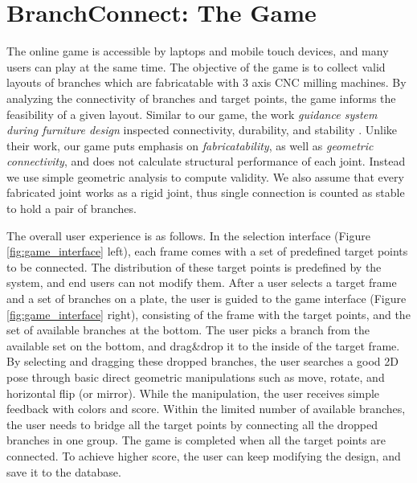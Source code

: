 \section{BranchConnect: The Game}
\label{sec:game}
The online game is accessible by laptops and mobile touch devices, and many users can play at the same time.
The objective of the game is to collect valid layouts of branches which are fabricatable with 3 axis CNC milling machines.
By analyzing the connectivity of branches and target points, the game informs the feasibility of a given layout.
Similar to our game, the work \textit{guidance system during furniture design} inspected connectivity, durability, and stability \cite{umetani2012guided}.
Unlike their work, our game puts emphasis on \textit{fabricatability}, as well as \textit{geometric connectivity}, and does not calculate structural performance of each joint.
Instead we use simple geometric analysis to compute validity.
We also assume that every fabricated joint works as a rigid joint, thus single connection is counted as stable to hold a pair of branches.

The overall user experience is as follows.
In the selection interface (Figure \ref{fig:game_interface} left), each frame comes with a set of predefined target points to be connected.
The distribution of these target points is predefined by the system, and end users can not modify them.
After a user selects a target frame and a set of branches on a plate, the user is guided to the game interface (Figure \ref{fig:game_interface} right), consisting of the frame with the target points, and the set of available branches at the bottom.
The user picks a branch from the available set on the bottom, and drag\&drop it to the inside of the target frame.
By selecting and dragging these dropped branches, the user searches a good 2D pose through basic direct geometric manipulations such as move, rotate, and horizontal flip (or mirror).
While the manipulation, the user receives simple feedback with colors and score.
Within the limited number of available branches, the user needs to bridge all the target points by connecting all the dropped branches in one group.
The game is completed when all the target points are connected.
To achieve higher score, the user can keep modifying the design, and save it to the database.

